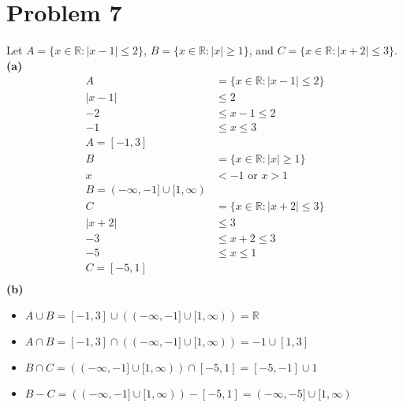 \documentclass[11pt]{article}
\begin{document}
\section*{Problem 7}
Let $ A = \{x \in \mathbb{R}: |x-1| \leq 2\}$, $ B = \{x \in \mathbb{R}: |x| \geq 1\}$, and $ C = \{x \in \mathbb{R}: |x+2| \leq 3\}$.\\
\textbf{(a)}
\begin{align*}
    A &= \{x \in \mathbb{R} : |x-1| \le 2\} \\
    |x-1| &\le 2 \\
    -2 &\le x-1 \le 2 \\
    -1 &\le x \le 3 \\
    \boxed{A = [-1, 3]}\\
    B &= \{x \in \mathbb{R} : |x| \geq 1\} \\
    x &< -1 \text{ or } x > 1\\
    \boxed{B = (- \infty , -1] \cup [1, \infty )}\\
    C &= \{x \in \mathbb{R} : |x+2| \leq 3\} \\
    |x+2| &\le 3\\
    -3 &\le x+2 \le 3 \\
    -5 &\le x \le 1 \\
    \boxed{C = [-5, 1]}\\
\end{align*}
\textbf{(b)}
\begin{itemize}
    \item $A \cup B = [-1, 3] \cup ( (- \infty , -1] \cup [1, \infty ) ) = \mathbb{R}$
    \item $A \cap B = [-1, 3] \cap ( (- \infty , -1] \cup [1, \infty ) ) = -1 \cup [1, 3]$
    \item $B \cap C = ( (- \infty , -1] \cup [1, \infty ) ) \cap [-5, 1] = [-5, -1] \cup 1$
    \item $B - C = ( (- \infty , -1] \cup [1, \infty ) ) - [-5, 1] = (- \infty , -5] \cup [1, \infty )$
\end{itemize}
\end{document}
